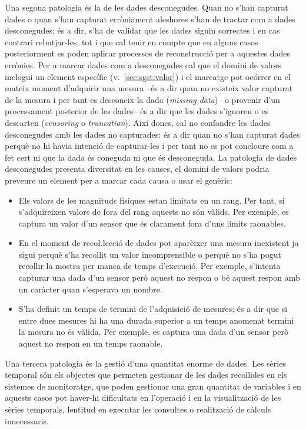 Una segona patologia és la de les dades desconegudes. Quan no s'han
capturat dades o quan s'han capturat erròniament aleshores s'han de
tractar com a dades desconegudes; és a dir, s'ha de validar que les
dades siguin correctes i en cas contrari rebutjar-les, tot i que cal
tenir en compte que en alguns casos posteriorment es poden aplicar
processos de reconstrucció per a aquestes dades errònies.  
%
Per a marcar dades com a desconegudes cal que el domini de valors
inclogui un element específic (v.~\autoref{sec:sgst:valor}) i el
marcatge pot ocórrer en el mateix moment d'adquirir una mesura --és a
dir quan no existeix valor capturat de la mesura i per tant es
desconeix la dada (\emph{missing data})-- o provenir d'un processament
posterior de les dades-- és a dir que les dades s'ignoren o es
descarten (\emph{censoring} o \emph{truncation}).  Així doncs, cal no
confondre les dades desconegudes amb les dades no capturades: és a dir quan no s'han capturat dades perquè no
hi havia intenció de capturar-les i per tant no es pot concloure com a
fet cert ni que la dada és coneguda ni que és desconeguda.  La
patologia de dades desconegudes presenta diversitat en les causes, el
domini de valors podria preveure un element per a marcar cada causa o
usar el genèric:
\begin{itemize}

\item Els valors de les magnituds físiques estan limitats en un
  rang. Per tant, si s'adquireixen valors de fora del rang aquests no
  són vàlids. Per exemple, es captura un valor d'un sensor que és
  clarament fora d'uns límits raonables.

\item En el moment de reco\l.lecció de dades pot aparèixer una mesura
  inexistent ja sigui perquè s'ha recollit un valor incomprensible o
  perquè no s'ha pogut recollir la mostra per manca de temps
  d'execució. Per exemple, s'intenta capturar una dada d'un sensor
  però aquest no respon o bé aquest respon amb un caràcter quan
  s'esperava un nombre.

\item S'ha definit un temps de termini de l'adquisició de mesures; és
  a dir que si entre dues mesures hi ha una durada superior a un temps
  anomenat termini la mesura no és vàlida. Per exemple, es captura una
  dada d'un sensor però aquest no respon en un temps raonable.

\end{itemize}


Una tercera patologia és la gestió d’una quantitat enorme de dades.
Les sèries temporal són els objectes que permeten gestionar de les
dades recollides en els sistemes de monitoratge, que poden gestionar
una gran quantitat de variables i en aquests casos pot haver-hi
dificultats en l'operació i en la visualització de les sèries
temporals, lentitud en executar les consultes o realització de càlculs
innecessaris.


